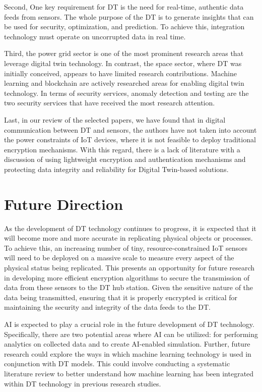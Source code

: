 Second, One key requirement for DT is the need for real-time, authentic data feeds from sensors. The whole purpose of the DT is to generate insights that can be used for security, optimization, and prediction. To achieve this, integration technology must operate on uncorrupted data in real time.

Third, the power grid sector is one of the most prominent research areas that leverage digital twin technology. In contrast, the space sector, where DT was initially conceived, appears to have limited research contributions. Machine learning and blockchain are actively researched areas for enabling digital twin technology. In terms of security services, anomaly detection and testing are the two security services that have received the most research attention.

Last, in our review of the selected papers, we have found that in digital communication between DT and sensors, the authors have not taken into account the power constraints of IoT devices, where it is not feasible to deploy traditional encryption mechanisms. With this regard, there is a lack of literature with a discussion of using lightweight encryption and authentication mechanisms and protecting data integrity and reliability for Digital Twin-based solutions. 




\section{Future Direction}
As the development of DT technology continues to progress, it is expected that it will become more and more accurate in replicating physical objects or processes. To achieve this, an increasing number of tiny, resource-constrained IoT sensors will need to be deployed on a massive scale to measure every aspect of the physical status being replicated. This presents an opportunity for future research in developing more efficient encryption algorithms to secure the transmission of data from these sensors to the DT hub station. Given the sensitive nature of the data being transmitted, ensuring that it is properly encrypted is critical for maintaining the security and integrity of the data feeds to the DT.

AI is expected to play a crucial role in the future development of DT technology. Specifically, there are two potential areas where AI can be utilized: for performing analytics on collected data and to create AI-enabled simulation. Further, future research could explore the ways in which machine learning technology is used in conjunction with DT models. This could involve conducting a systematic literature review to better understand how machine learning has been integrated within DT technology in previous research studies.

